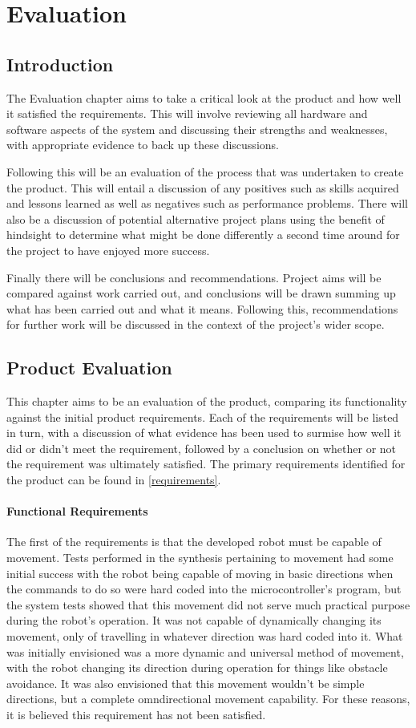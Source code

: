 \part{Evaluation}
	\chapter{Introduction}
	The Evaluation chapter aims to take a critical look at the product and how well it satisfied the requirements. This will involve reviewing all hardware and software aspects of the system and discussing their strengths and weaknesses, with appropriate evidence to back up these discussions. 
	
	Following this will be an evaluation of the process that was undertaken to create the product. This will entail a discussion of any positives such as skills acquired and lessons learned as well as negatives such as performance problems. There will also be a discussion of potential alternative project plans using the benefit of hindsight to determine what might be done differently a second time around for the project to have enjoyed more success.
	
	Finally there will be conclusions and recommendations. Project aims will be compared against work carried out, and conclusions will be drawn summing up what has been carried out and what it means. Following this, recommendations for further work will be discussed in the context of the project's wider scope.
	
	\chapter{Product Evaluation}
	This chapter aims to be an evaluation of the product, comparing its functionality against the initial product requirements. Each of the requirements will be listed in turn, with a discussion of what evidence has been used to surmise how well it did or didn't meet the requirement, followed by a conclusion on whether or not the requirement was ultimately satisfied. The primary requirements identified for the product can be found in \ref{requirements}.
	
		\subsection{Functional Requirements}
		The first of the requirements is that the developed robot must be capable of movement. Tests performed in the synthesis pertaining to movement had some initial success with the robot being capable of moving in basic directions when the commands to do so were hard coded into the microcontroller's program, but the system tests showed that this movement did not serve much practical purpose during the robot's operation. It was not capable of dynamically changing its movement, only of travelling in whatever direction was hard coded into it. What was initially envisioned was a more dynamic and universal method of movement, with the robot changing its direction during operation for things like obstacle avoidance. It was also envisioned that this movement wouldn't be simple directions, but a complete omndirectional movement capability. For these reasons, it is believed this requirement has not been satisfied.
		
